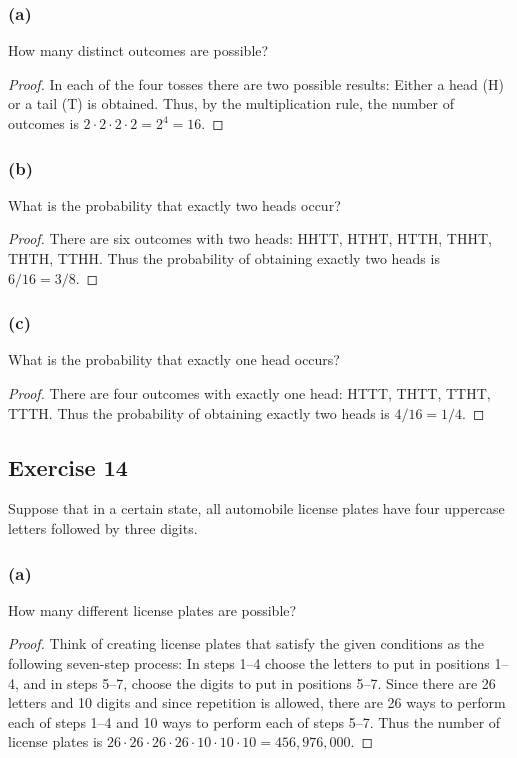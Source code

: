 \documentclass[14pt]{extarticle}
\begin{document}
\subsubsection{(a)}
How many distinct outcomes are possible?

\begin{proof}
     In each of the four tosses there are two possible results: Either a head (H) or a tail (T) is obtained. Thus, by the
     multiplication rule, the number of outcomes is \(2 \cdot 2 \cdot 2 \cdot 2 = 2^4 = 16\).
\end{proof}

\subsubsection{(b)}
What is the probability that exactly two heads occur?

\begin{proof}
     There are six outcomes with two heads: HHTT, HTHT, HTTH, THHT, THTH, TTHH. Thus the probability of obtaining exactly
     two heads is \(6/16 = 3/8\).
\end{proof}

\subsubsection{(c)}
What is the probability that exactly one head occurs?

\begin{proof}
     There are four outcomes with exactly one head: HTTT, THTT, TTHT, TTTH. Thus the probability of obtaining exactly two
     heads is \(4/16 = 1/4\).
\end{proof}

\subsection{Exercise 14}
Suppose that in a certain state, all automobile license plates have four uppercase letters followed by three
digits.

\subsubsection{(a)}
How many different license plates are possible?

\begin{proof}
     Think of creating license plates that satisfy the given conditions as the following seven-step process: In steps
     1–4 choose the letters to put in positions 1–4, and in steps 5–7, choose the digits to put in positions 5–7. Since
     there are 26 letters and 10 digits and since repetition is allowed, there are 26 ways to perform each of steps 1–4 and
     10 ways to perform each of steps 5–7. Thus the number of license plates is \(26 \cdot 26 \cdot 26 \cdot 26 \cdot 10
     \cdot 10 \cdot 10 = 456,976,000\).
\end{proof}
\end{document}
